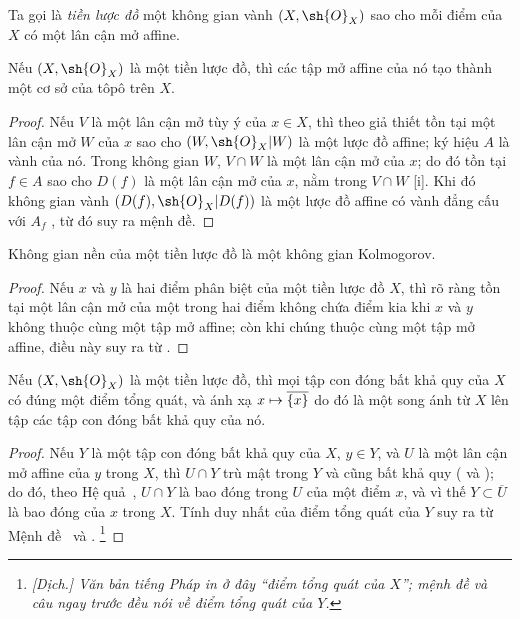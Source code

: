 \documentclass[oneside]{amsart}
\makeatletter
\newcommand{\ega@arrow}[2]{\mathchoice{#1}{#2}{#2}{#2}}
\let\ega@shortmapsto\mapsto
\renewcommand{\mapsto}{\ega@arrow{\longmapsto}{\ega@shortmapsto}}
\newcommand{\oldpage}[2][]{{\marginnote{\normalfont\textbf{#1}~|~#2}}\ignorespaces}
\let\EGAOriginalLabel\label
\renewcommand{\label}[1]{\phantomsection\EGAOriginalLabel{#1}}
\makeatother
\begin{document}
\begin{definition}[2.1.2]
\label{I.2.1.2}
Ta gọi là \emph{tiền lược đồ} một không gian vành $(X,\sh{O}_X)$ sao
cho mỗi điểm của $X$ có một lân cận mở affine.
\end{definition}

\begin{proposition}[2.1.3]
\label{I.2.1.3}
\oldpage[I]{98}
Nếu $(X,\sh{O}_X)$ là một tiền lược đồ, thì các tập mở affine của nó
tạo thành một cơ sở của tôpô trên $X$.
\end{proposition}

\begin{proof}
Nếu $V$ là một lân cận mở tùy ý của $x\in X$, thì theo giả thiết tồn
tại một lân cận mở $W$ của $x$ sao cho $(W,\sh{O}_X|W)$ là một lược
đồ affine; ký hiệu $A$ là vành của nó. Trong không gian $W$,
$V\cap W$ là một lân cận mở của $x$; do đó tồn tại $f\in A$ sao cho
$D(f)$ là một lân cận mở của $x$, nằm trong $V\cap W$
[i]. Khi đó không gian vành
$(D(f),\sh{O}_X|D(f))$ là một lược đồ affine có vành đẳng cấu với
$A_f$ , từ đó suy ra mệnh đề.
\end{proof}

\begin{proposition}[2.1.4]
\label{I.2.1.4}
Không gian nền của một tiền lược đồ là một không gian Kolmogorov.
\end{proposition}

\begin{proof}
Nếu $x$ và $y$ là hai điểm phân biệt của một tiền lược đồ $X$, thì rõ
ràng tồn tại một lân cận mở của một trong hai điểm không chứa điểm kia
khi $x$ và $y$ không thuộc cùng một tập mở affine; còn khi chúng thuộc
cùng một tập mở affine, điều này suy ra từ .
\end{proof}

\begin{proposition}[2.1.5]
\label{I.2.1.5}
Nếu $(X,\sh{O}_X)$ là một tiền lược đồ, thì mọi tập con đóng bất khả
quy của $X$ có đúng một điểm tổng quát, và ánh xạ
$x\mapsto\overline{\{x\}}$ do đó là một song ánh từ $X$ lên tập các
tập con đóng bất khả quy của nó.
\end{proposition}

\begin{proof}
Nếu $Y$ là một tập con đóng bất khả quy của $X$, $y\in Y$, và $U$ là
một lân cận mở affine của $y$ trong $X$, thì $U\cap Y$ trù mật trong
$Y$ và cũng bất khả quy ( và
); do đó, theo Hệ quả~, $U\cap Y$ là
bao đóng trong $U$ của một điểm $x$, và vì thế
$Y\subset\overline{U}$ là bao đóng của $x$ trong $X$. Tính duy nhất
của điểm tổng quát của $Y$ suy ra từ Mệnh đề~ và
.
\footnote{\emph{[Dịch.] Văn bản tiếng Pháp in ở đây ``điểm tổng quát
của $X$''; mệnh đề và câu ngay trước đều nói về điểm tổng quát của
$Y$.}}
\end{proof}
\end{document}
